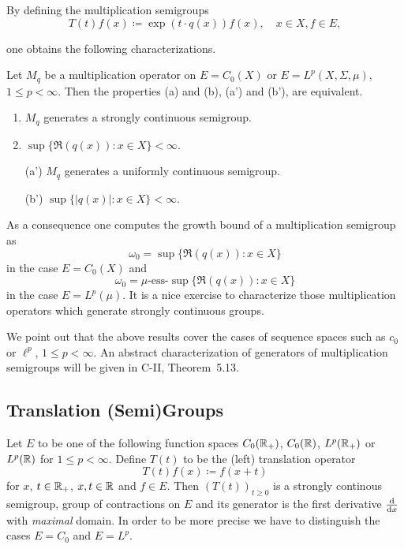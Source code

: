 By defining the multiplication semigroups
\[
    T(t)f(x) \coloneqq \exp(t \cdot q(x))f(x), \quad x \in X, f \in E,
\]

one obtains the following characterizations.
\begin{proposition*}\label{prop:a1-2.3}
Let $M_{q}$ be a multiplication operator on $E = C_{0}(X)$ or $E = L^{p}(X,\Sigma,\mu)$, $1 \leq p < \infty$.
Then the properties (a) and (b), \resp (a') and (b'), are equivalent.
\begin{enumerate}[\upshape (a)]
\item 
	$M_{q}$ generates a strongly continuous semigroup.

\item 
	$\sup\{\Re( q(x)) \colon x \in X \} < \infty$.

\item[\upshape (a')] 
	$M_{q}$ generates a uniformly continuous semigroup.

\item[(b')] 
	$\sup\{|q(x)| \colon x \in X \} < \infty$.
\end{enumerate}
\end{proposition*}
As a consequence one computes the growth bound of a multiplication semigroup as
\[
    \omega_{0} = \sup\{\Re(q(x)) \colon x \in X\} 
\]
in the case $E = C_{0}(X)$ and 
\[
    \omega_{0} = \mu\text{-ess-}\sup\{\Re(q(x)) \colon x \in X\} 
\]
in the case  $E = L^{p}(\mu)$.
It is a nice exercise to characterize those multiplication operators which generate strongly continuous groups.

We point out that the above results cover the cases of sequence spaces such as $c_{0}$ or $\ell^{p}$, $1 \leq p < \infty$.
An abstract characterization of generators of multiplication semigroups will be given in C-II, Theorem~5.13.
\subsection{Translation (Semi)Groups}\label{subsec:a1-2.4}
Let $E$ to be one of the following function spaces $C_{0}(\mathbb{R}_{+})$, $C_{0}(\mathbb{R})$, $L^{p}(\mathbb{R}_{+})$ or $L^{p}(\mathbb{R})$ for $1 \leq p < \infty$.
Define $T(t)$ to be the (left) translation operator
\[
    T(t)f(x) \coloneqq f(x+t)
\]
for $x$, $ t \in \mathbb{R}_{+}$, \resp $x, t \in \mathbb{R}$ and $f \in E$.
Then $(T(t))_{t \geq 0}$ is a strongly continous semigroup, \resp group of contractions on $E$ and its generator is the first derivative $\frac{\mathop{}\!\mathrm{d}{}}{\mathop{}\!\mathrm{d}{x}}$ with \emph{maximal} domain.
In order to be more precise we have to distinguish the cases $E = C_{0}$ and $E = L^{p}$.

